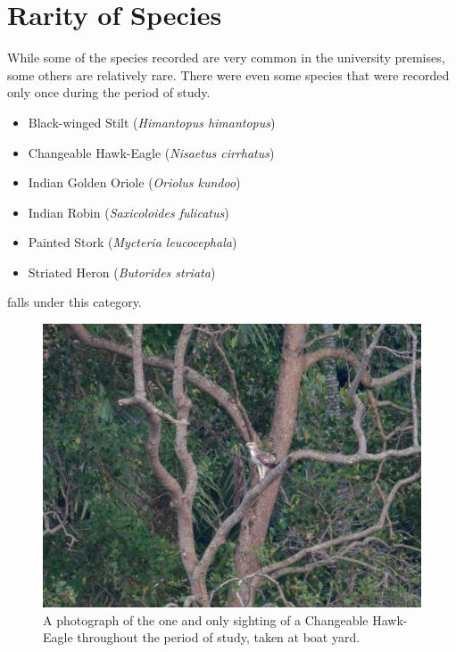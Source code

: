 \section{Rarity of Species}
While some of the species recorded are very common in the university premises, some others are relatively rare. There were even some species that were recorded only once during the period of study.
\begin{itemize}
    \item Black-winged Stilt (\textit{Himantopus himantopus})
    \item Changeable Hawk-Eagle (\textit{Nisaetus cirrhatus})
    \item Indian Golden Oriole (\textit{Oriolus kundoo})
    \item Indian Robin (\textit{Saxicoloides fulicatus})
    \item Painted Stork (\textit{Mycteria leucocephala})
    \item Striated Heron (\textit{Butorides striata})
\end{itemize}
falls under this category.
\begin{figure}[!htpb]
    \centering
    \includegraphics[width=\linewidth]{Figures/crested-hawk.jpg}
    \caption[]{A photograph of the one and only sighting of a Changeable Hawk-Eagle throughout the period of study, taken at boat yard.}
    \label{fig:figure-01}
\end{figure}


